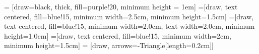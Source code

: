 
 = [draw=black, thick, fill=purple!20, minimum height = 1em]
 =[draw, text centered, fill=blue!15, minimum width=2.5cm, minimum height=1.5cm]
 =[draw, text centered, fill=blue!15, minimum width=2.0cm, text width=2.0cm, minimum height=1.0cm]
 =[draw, text centered, fill=blue!15, minimum width=2cm, minimum height=1.5cm]
 = [draw, arrows={-Triangle[length=0.2cm]}]


